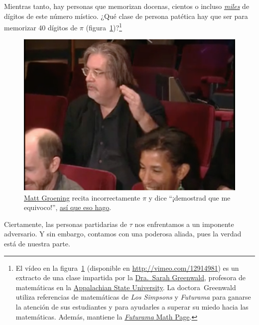 Mientras tanto, hay personas que memorizan docenas, cientos o incluso  \href{https://www.guinnessworldrecords.com/world-records/most-pi-places-memorised}{\emph{miles}} de dígitos de este número místico. ¿Qué clase de persona patética hay que ser para memorizar 40 dígitos de $\pi$ (figura~\ref{fig:futurama_video})?\footnote{El vídeo en la figura~\ref{fig:futurama_video} (disponible en  \href{http://vimeo.com/12914981}{http://vimeo.com/12914981}) es un extracto de una clase impartida por la \href{https://cs.appstate.edu/~sjg/}{Dra.\ Sarah Greenwald}, profesora de matemáticas en la \href{http://www.appstate.edu/}{Appalachian State University}. La doctora\ Greenwald utiliza referencias de matemáticas de \emph{Los Simpsons} y \emph{Futurama} para ganarse la atención de sus estudiantes y para ayudarles a superar su miedo hacia las matemáticas. Además, mantiene la \href{http://mathsci2.appstate.edu/~sjg/futurama/}{\emph{Futurama} Math Page}.}

\begin{figure}
\begin{center}
\includegraphics{images/figures/futurama_math_lecture.png} %
\end{center}
\caption{\href{https://es.wikipedia.org/wiki/Matt_Groening}{Matt Groening} recita incorrectamente $\pi$ y dice  ``¡demostrad que me equivoco!'', \href{https://vimeo.com/12914981}{así que eso hago}.\label{fig:futurama_video}}
\end{figure}

Ciertamente, las personas partidarias de $\tau$ nos enfrentamos a un imponente adversario. Y sin embargo, contamos con una poderosa aliada, pues la verdad está de nuestra parte.

